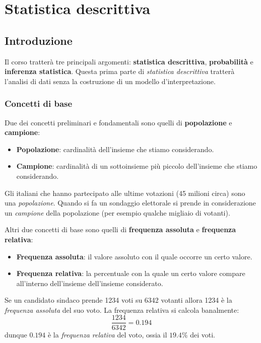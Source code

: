 \part{Statistica descrittiva}
\chapter{Introduzione}
Il corso tratterà tre principali argomenti: \textbf{statistica descrittiva}, \textbf{probabilità} e
\textbf{inferenza statistica}. Questa prima parte di \emph{statistica descrittiva} tratterà l'analisi di dati
senza la costruzione di un modello d'interpretazione.

\section{Concetti di base}
Due dei concetti preliminari e fondamentali sono quelli di \textbf{popolazione} e \textbf{campione}:
\begin{itemize}
	\item \textbf{Popolazione}: cardinalità dell'insieme che stiamo considerando.
	\item \textbf{Campione}: cardinalità di un sottoinsieme più piccolo dell'insieme che stiamo considerando.
\end{itemize}

\begin{example}
	Gli italiani che hanno partecipato alle ultime votazioni (45 milioni circa) sono una \emph{popolazione}.
	Quando si fa un sondaggio elettorale si prende in considerazione un \emph{campione} della popolazione (per
	esempio qualche migliaio di votanti).
\end{example}

Altri due concetti di base sono quelli di \textbf{frequenza assoluta} e \textbf{frequenza relativa}:
\begin{itemize}
	\item \textbf{Frequenza assoluta}: il valore assoluto con il quale occorre un certo valore.
	\item \textbf{Frequenza relativa}: la percentuale con la quale un certo valore compare all'interno
	      dell'insieme dell'insieme considerato.
\end{itemize}

\begin{example}
	Se un candidato sindaco prende 1234 voti su 6342 votanti allora 1234 è la \emph{frequenza assoluta} del
	suo voto. La frequenza relativa si calcola banalmente:
	\[ \frac{1234}{6342} = 0.194 \]
	dunque $0.194$ è la \emph{frequenza relativa} del voto, ossia il $19.4 \%$ dei voti.
\end{example}

